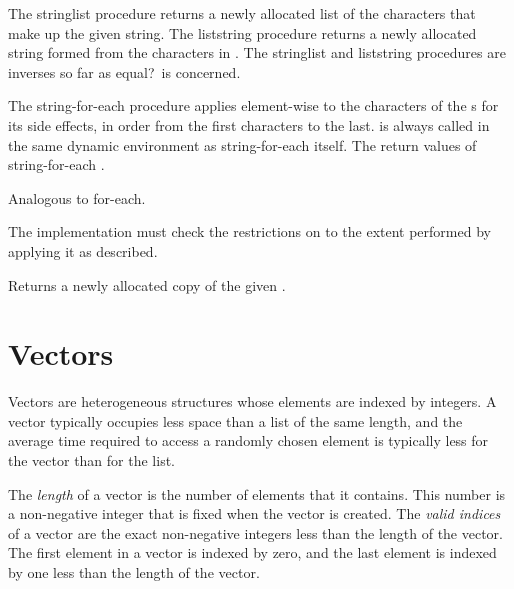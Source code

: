 \begin{entry}{%
}

The {\cf string\coerce{}list} procedure returns a newly allocated list of the
characters that make up the given string.  The {\cf
  list\coerce{}string} procedure
returns a newly allocated string formed from the characters in 
. The {\cf string\coerce{}list}
and {\cf list\coerce{}string} procedures are
inverses so far as {\cf equal?}\ is concerned.  
\end{entry}

\begin{entry}{%
}

The {\cf string-for-each} procedure applies 
element-wise to the characters of the
s for its side effects,  in order from the first characters to the
last.
 is always called in the same dynamic environment 
as {\cf string-for-each} itself.
The return values of {\cf string-for-each} \areunspecified.

Analogous to {\cf for-each}.

\implresp The implementation must check the restrictions
on  to the extent performed by applying it as described.
\end{entry}

\begin{entry}{%
}

Returns a newly allocated copy of the given .

\end{entry}

\section{Vectors}
\label{vectorsection}

Vectors are heterogeneous structures whose elements are indexed
by integers.  A vector typically occupies less space than a list
of the same length, and the average time required to access a randomly
chosen element is typically less for the vector than for the list.

\vest The {\em length} of a vector is the number of elements that it
contains.  This number is a non-negative integer that is fixed when the
vector is created.  The {\em valid indices} of a
vector are the exact non-negative integers less than the length of the
vector.  The first element in a vector is indexed by zero, and the last
element is indexed by one less than the length of the vector.

